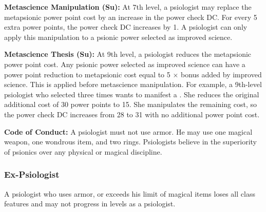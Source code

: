 {\textbf{Metascience Manipulation (Su):} At 7th level, a psiologist may replace the metapsionic power point cost by an increase in the power check DC. For every 5 extra power points, the power check DC increases by 1. A psiologist can only apply this manipulation to a psionic power selected as improved science.

\textbf{Metascience Thesis (Su):} At 9th level, a psiologist reduces the metapsionic power point cost. Any psionic power selected as improved science can have a power point reduction to metapsionic cost equal to 5 $\times$ bonus added by improved science. This is applied before metascience manipulation. For example, a 9th-level psiologist who selected  three times wants to manifest a . She reduces the original  additional cost of 30 power points to 15. She manipulates the remaining cost, so the power check DC increases from 28 to 31 with no additional power point cost.

\textbf{Code of Conduct:} A psiologist must not use armor. He may use one magical weapon, one wondrous item, and two rings. Psiologists believe in the superiority of psionics over any physical or magical discipline.

\subsubsection{Ex-Psiologist}
A psiologist who uses armor, or exceeds his limit of magical items loses all class features and may not progress in levels as a psiologist.
}
